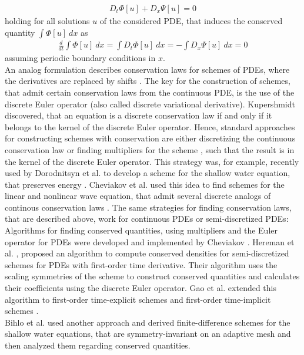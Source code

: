 \documentclass[manuscript]{acmart}
\newcommand{\1}{{\chi}}
\numberwithin{equation}{section}
\theoremstyle{thmlemcorr}
\numberwithin{theorem}{section}
\theoremstyle{thmlemcorr*}
\theoremstyle{defi}
\theoremstyle{remexample}
\theoremstyle{ass}
\begin{document}
\begin{gather*}
	D_t\Phi[u]+D_x\Psi[u]=0
\end{gather*}
holding for all solutions $u$ of the considered PDE,
that induces the conserved quantity $\int \Phi[u]\ dx$ as
\begin{gather*}
	\frac{d}{dt}\int \Phi[u]\ dx=\int D_t\Phi[u]\ dx=-\int D_x\Psi[u]\ dx=0
\end{gather*}
assuming periodic boundary conditions in $x$.\\
An analog formulation describes conservation laws for schemes of PDEs, where the derivatives are replaced by shifts \cite{hydon01}.  The key for the construction of schemes, that admit certain conservation laws from the continuous PDE, is the use of the discrete Euler operator \cite{cheviakov20} (also called discrete variational derivative). Kupershmidt \cite[II. Theorem 31]{kupershmidt85} discovered, that an equation is a discrete conservation law if and only if it belongs to the kernel of the discrete Euler operator. Hence, standard approaches for constructing schemes with conservation are either discretizing the continuous conservation law or finding multipliers for the scheme \cite{dorodnitsyn21}, such that the result is in the kernel of the discrete Euler operator.
This strategy was, for example, recently used by Dorodnitsyn et al. to develop a scheme for the shallow water equation, that preserves energy \cite{dorodnitsyn21}. Cheviakov et al. used this idea to find schemes for the linear and nonlinear wave equation, that admit several discrete analogs of continous conservation laws \cite{cheviakov20}.
The same strategies for finding conservation laws, that are described above, work for continuous PDEs or semi-discretized PDEs:
Algorithms for finding conserved quantities, using multipliers and the Euler operator for PDEs were developed and implemented by Cheviakov \cite{cheviakov07,cheviakov10}.
Hereman et al. \cite{hereman04,hereman08}, proposed an algorithm to compute conserved densities for semi-discretized schemes for PDEs with first-order time derivative. 
Their algorithm uses the scaling symmetries of the scheme to construct conserved quantities and calculates their coefficients using the discrete Euler operator.
Gao et al. extended this algorithm to first-order time-explicit schemes \cite{gao02} and first-order time-implicit schemes \cite{gao04}.\\
Bihlo et al. \cite{bihlo12} used another approach and derived finite-difference schemes for the shallow water equations, that are symmetry-invariant on an adaptive mesh and then analyzed them regarding conserved quantities.\\
\end{document}
